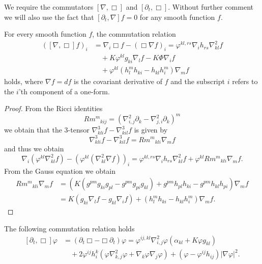 \documentclass{amsart}
\begin{document}
We require the commutators \([\nabla, \Box]\) and \([\partial_t, \Box]\). Without further comment we will also use the fact that \([\partial_t, \nabla] f = 0\) for any smooth function \(f\).

\begin{lemma}
\label{lem:gradBox}
For every smooth function $f$, the commutation relation
\[
\begin{split}
([\nabla, \Box]f)_i &= \nabla_i \Box f - (\Box \nabla f)_i = \varphi^{kl,rs} \nabla_i h_{rs} \nabla^2_{kl} f \\
&\quad + K \varphi^{kl} g_{ki} \nabla_l f - K \Phi \nabla_i f \\
&\quad + \varphi^{kl}\left(h^{m}_{l}h_{ki} - h_{kl}h^{m}_{i}\right) \nabla_m f
\end{split}
\]
holds, where \(\nabla f = df\) is the covariant derivative of \(f\) and the subscript \(i\) refers to the \(i\)'th component of a one-form.
\end{lemma}

\begin{proof}
From the Ricci identities
\[
{Rm^m}_{kij}  = \left(\nabla^2_{i, j} \partial_k - \nabla^2_{j,i} \partial_k\right)^m
\]
we obtain that the $3$-tensor $\nabla^3_{kli}f-\nabla^3_{kil}f$
is given by
\[
\nabla^3_{kli}f-\nabla^3_{kil}f={Rm^m}_{kli}\nabla_m f
\]
and thus we obtain
\[
\nabla_i (\varphi^{kl} \nabla^2_{kl} f) - (\varphi^{kl}(\nabla^2_{kl} \nabla f))_i = \varphi^{kl,rs} \nabla_i h_{rs} \nabla^2_{kl}f + \varphi^{kl}{Rm^{m}}_{kli} \nabla_m f.
\]
From the Gauss equation we obtain
\[
\begin{split}
{Rm^{m}}_{kli} \nabla_m f &= \left(K\left(g^{pm}g_{ki}g_{pl}  - g^{pm}g_{pi}g_{kl}\right) + g^{pm} h_{pl}h_{ki} - g^{pm}h_{kl}h_{pi}\right) \nabla_m f \\
&= K\left(g_{ki} \nabla_l f - g_{kl} \nabla_i f\right) + \left(h^{m}_{l}h_{ki} - h_{kl}h^{m}_{i}\right) \nabla_m f.
\end{split}
\]
\end{proof}

\begin{lemma}
\label{lem:deltBox}
The following commutation relation holds
\[
\begin{split}
[\partial_t, \Box] \varphi &= (\partial_{t}\Box - \Box\partial_{t}) \varphi = \varphi^{ij,kl} \nabla^2_{i,j} \varphi (\alpha_{kl} + K \varphi g_{kl}) \\
&\quad + 2\varphi^{ij}h^{k}_{i} (\varphi \nabla^2_{k,j} \varphi + \nabla_k \varphi \nabla_j \varphi) + (\varphi - \varphi^{ij}h_{ij})| \nabla\varphi|^{2}.
\end{split}
\]
\end{lemma}
\end{document}

